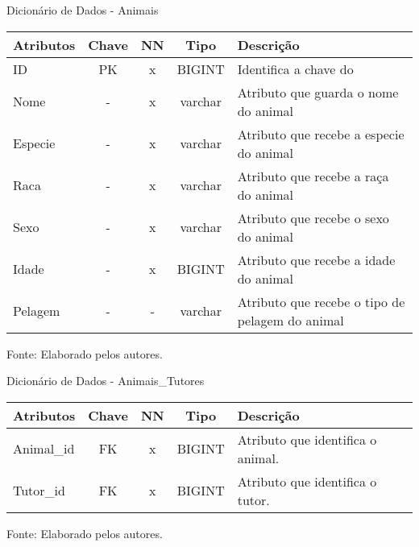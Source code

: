 \documentclass[
    12pt,               %
    openright,          %
    oneside,
    a4paper,            %
    BIBLATEX,           %
    TODO,               %
    english,            %
    brazil              %
    ]{ifsp-spo-inf-ctds}
\begin{document}
            \begin{center}
              \begin{quadro}[H]
              \centering
                  \caption{Dicionário de Dados - Animais}
                  \begin{tabulary}{1.0\textwidth}{|p{9em}|c|c|c|p{19em}|}
                \hline
                Atributos & Chave & NN & Tipo & Descrição\\
                \hline
                ID & PK & x & BIGINT & Identifica a chave do \\
                \hline
                Nome & - & x & varchar & Atributo que guarda o nome do animal\\
                \hline
                Especie & - & x & varchar & Atributo que recebe a especie do animal\\
                \hline
                Raca & - & x & varchar & Atributo que recebe a raça do animal \\
                \hline
                Sexo & - & x & varchar & Atributo que recebe o sexo do animal\\
                \hline
                Idade & - & x & BIGINT & Atributo que recebe a idade do animal\\
                \hline
                Pelagem & - & - & varchar & Atributo que recebe o tipo de pelagem do animal \\
                \hline
                \end{tabulary}
                 
                  \label{qd: md-animal}
                  \centering
        {\footnotesize Fonte: Elaborado pelos autores.}
              \end{quadro}
            \end{center}
            
    \begin{center}
      \begin{quadro}[H]
      \centering
          \caption{Dicionário de Dados - Animais\_Tutores}
          \begin{tabulary}{1.0\textwidth}{|p{9em}|c|c|c|p{19em}|}
        \hline
        Atributos & Chave & NN & Tipo & Descrição\\
        \hline
        Animal\_id & FK & x & BIGINT & Atributo que identifica o animal. \\
        \hline
        Tutor\_id & FK & x & BIGINT & Atributo que identifica o tutor.\\
        \hline
        \end{tabulary}

          \label{qd: md-animaltutor}
          \centering
        {\footnotesize Fonte: Elaborado pelos autores.}
      \end{quadro}
    \end{center}
\end{document}
